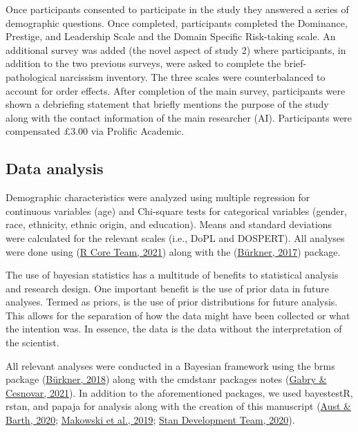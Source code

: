\documentclass[
  donotrepeattitle,doc, 12pt, a4paper,floatsintext]{apa7}
\begin{document}
Once participants consented to participate in the study they answered a series of demographic questions. Once completed, participants completed the Dominance, Prestige, and Leadership Scale and the Domain Specific Risk-taking scale. An additional survey was added (the novel aspect of study 2) where participants, in addition to the two previous surveys, were asked to complete the brief-pathological narcissism inventory. The three scales were counterbalanced to account for order effects. After completion of the main survey, participants were shown a debriefing statement that briefly mentions the purpose of the study along with the contact information of the main researcher (AI). Participants were compensated £3.00 via Prolific Academic.

\hypertarget{data-analysis-1}{%
\subsection{Data analysis}\label{data-analysis-1}}

Demographic characteristics were analyzed using multiple regression for continuous variables (age) and Chi-square tests for categorical variables (gender, race, ethnicity, ethnic origin, and education). Means and standard deviations were calculated for the relevant scales (i.e., DoPL and DOSPERT). All analyses were done using (\protect\hyperlink{ref-rcoreteam2021}{R Core Team, 2021}) along with the (\protect\hyperlink{ref-burkner2017}{Bürkner, 2017}) package.

The use of bayesian statistics has a multitude of benefits to statistical analysis and research design. One important benefit is the use of prior data in future analyses. Termed as priors, is the use of prior distributions for future analysis. This allows for the separation of how the data might have been collected or what the intention was. In essence, the data is the data without the interpretation of the scientist.

All relevant analyses were conducted in a Bayesian framework using the brms package (\protect\hyperlink{ref-burkner2018}{Bürkner, 2018}) along with the cmdstanr packages notes (\protect\hyperlink{ref-gabry2021}{Gabry \& Cesnovar, 2021}). In addition to the aforementioned packages, we used bayestestR, rstan, and papaja for analysis along with the creation of this manuscript (\protect\hyperlink{ref-aust2020}{Aust \& Barth, 2020}; \protect\hyperlink{ref-makowski2019}{Makowski et al., 2019}; \protect\hyperlink{ref-standevelopmentteam2020}{Stan Development Team, 2020}).
\end{document}
